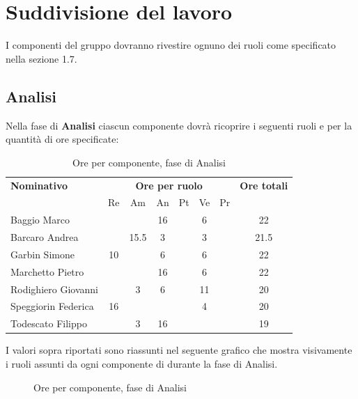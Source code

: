 \section{Suddivisione del lavoro}
I componenti del gruppo dovranno rivestire ognuno dei ruoli come specificato nella sezione
1.7.
\subsection{Analisi}
Nella fase di \textbf{Analisi} ciascun componente dovrà ricoprire i seguenti ruoli e per la quantità di ore specificate:

\begin{table}[H]
\centering
\begin{tabular}{|l|c|c|c|c|c|c|c|}
\hline
\textbf{Nominativo} & 
\multicolumn{6}{c|}{\textbf{Ore per ruolo}} & 
\textbf{Ore totali} \\
& Re & Am & An  & Pt & Ve & Pr & \\
\hline
Baggio Marco
  & 
  & 
  & 16
  & 
  & 6
  & 
  &
  22
  \\
Barcaro Andrea
  & 
  & 15.5
  & 3
  & 
  & 3
  & 
  &
 21.5
  \\
Garbin Simone
  & 10
  & 
  & 6
  & 
  & 6
  & 
  &
  22
  \\
Marchetto Pietro
  & 
  & 
  & 16
  & 
  & 6
  & 
  &
  22
  \\
Rodighiero Giovanni
  & 
  & 3
  & 6
  & 
  & 11
  & 
  &
  20
  \\
Speggiorin Federica
  & 16
  & 
  & 
  & 
  & 4
  & 
  &
  20
  \\
Todescato Filippo
  & 
  & 3
  & 16
  & 
  & 
  & 
  &
  19
  \\
\hline
\end{tabular}
\caption{Ore per componente, fase di Analisi}
\end{table}
I valori sopra riportati sono riassunti nel seguente grafico che mostra visivamente i ruoli assunti da ogni componente di \GroupName{} durante la fase di Analisi.
\begin{figure}[H]
\centering
{}
\caption{Ore per componente, fase di Analisi}
\end{figure}


